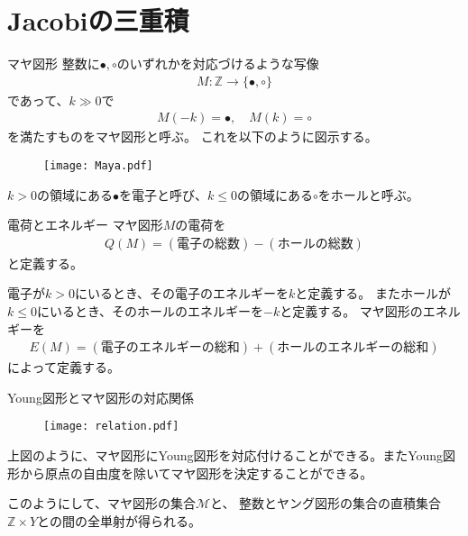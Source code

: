 \documentclass[\main/TL_liquid.tex]{subfiles}
\begin{document}
\section{Jacobiの三重積}

\begin{frame}{マヤ図形}
    整数に$\bullet,\circ$のいずれかを対応づけるような写像
    \begin{align}
        M: \mathbb{Z} \to \{\bullet,\circ\}
    \end{align}
    であって、$k \gg 0$で
    \begin{align}
        M(-k) = \bullet, \quad
        M(k) = \circ
    \end{align}
    を満たすものをマヤ図形と呼ぶ。
    これを以下のように図示する。
    \begin{figure}[H]
        \centering
        \texttt{[image: Maya.pdf]}
    \end{figure}
    $k>0$の領域にある$\bullet$を\alert{電子}と呼び、$k\le0$の領域にある$\circ$を\alert{ホール}と呼ぶ。
\end{frame}

\begin{frame}{電荷とエネルギー}
    マヤ図形$M$の電荷を
    \begin{align}
        Q(M) = (\text{電子の総数}) - (\text{ホールの総数})
    \end{align}
    と定義する。

    電子が$k > 0$にいるとき、その電子のエネルギーを$k$と定義する。
    またホールが$k \le 0$にいるとき、そのホールのエネルギーを$-k$と定義する。
    マヤ図形のエネルギーを
    \begin{align}
        E(M) = (\text{電子のエネルギーの総和}) + (\text{ホールのエネルギーの総和})
    \end{align}
    によって定義する。
\end{frame}


\begin{frame}{Young図形とマヤ図形の対応関係}
    \begin{figure}[H]
        \centering
        \texttt{[image: relation.pdf]}
    \end{figure}
    上図のように、マヤ図形にYoung図形を対応付けることができる。またYoung図形から原点の自由度を除いてマヤ図形を決定することができる。

    このようにして、マヤ図形の集合$\mathcal{M}$と、
    整数とヤング図形の集合の直積集合$\mathbb{Z} \times Y$との間の全単射が得られる。
\end{frame}
\end{document}

